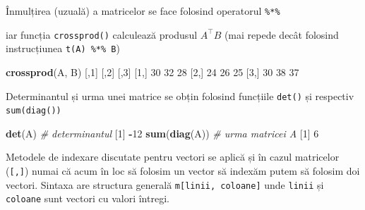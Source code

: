 \documentclass[]{article}
\newenvironment{Shaded}{\begin{snugshade}}{\end{snugshade}}
\newcommand{\KeywordTok}[1]{\textcolor[rgb]{0.13,0.29,0.53}{\textbf{#1}}}
\newcommand{\DecValTok}[1]{\textcolor[rgb]{0.00,0.00,0.81}{#1}}
\newcommand{\StringTok}[1]{\textcolor[rgb]{0.31,0.60,0.02}{#1}}
\newcommand{\CommentTok}[1]{\textcolor[rgb]{0.56,0.35,0.01}{\textit{#1}}}
\newcommand{\OperatorTok}[1]{\textcolor[rgb]{0.81,0.36,0.00}{\textbf{#1}}}
\newcommand{\NormalTok}[1]{#1}
\begin{document}
Înmulțirea (uzuală) a matricelor se face folosind operatorul
\texttt{\%*\%}

\begin{Shaded}
\end{Shaded}

iar funcția \texttt{crossprod()} calculează produsul \(A^\intercal B\)
(mai repede decât folosind instrucțiunea \texttt{t(A)\ \%*\%\ B})

\begin{Shaded}
\begin{Highlighting}[]
\KeywordTok{crossprod}\NormalTok{(A, B)}
\NormalTok{     [,}\DecValTok{1}\NormalTok{] [,}\DecValTok{2}\NormalTok{] [,}\DecValTok{3}\NormalTok{]}
\NormalTok{[}\DecValTok{1}\NormalTok{,]   }\DecValTok{30}   \DecValTok{32}   \DecValTok{28}
\NormalTok{[}\DecValTok{2}\NormalTok{,]   }\DecValTok{24}   \DecValTok{26}   \DecValTok{25}
\NormalTok{[}\DecValTok{3}\NormalTok{,]   }\DecValTok{30}   \DecValTok{38}   \DecValTok{37}
\end{Highlighting}
\end{Shaded}

Determinantul și urma unei matrice se obțin folosind funcțiile
\texttt{det()} și respectiv \texttt{sum(diag())}

\begin{Shaded}
\begin{Highlighting}[]
\KeywordTok{det}\NormalTok{(A) }\CommentTok{# determinantul}
\NormalTok{[}\DecValTok{1}\NormalTok{] }\OperatorTok{-}\DecValTok{12}
\KeywordTok{sum}\NormalTok{(}\KeywordTok{diag}\NormalTok{(A)) }\CommentTok{# urma matricei A}
\NormalTok{[}\DecValTok{1}\NormalTok{] }\DecValTok{6}
\end{Highlighting}
\end{Shaded}

Metodele de indexare discutate pentru vectori se aplică și în cazul
matricelor (\texttt{{[},{]}}) numai că acum în loc să folosim un vector
să indexăm putem să folosim doi vectori. Sintaxa are structura generală
\texttt{m{[}linii,\ coloane{]}} unde \texttt{linii} și \texttt{coloane}
sunt vectori cu valori întregi.
\end{document}
